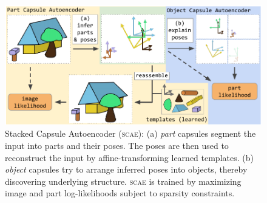 \begin{figure}
        \centering
        \includegraphics[width=.68\linewidth]{figures/SCA/blocks_v4}
        \caption{
            Stacked Capsule Autoencoder (\textsc{scae}):
            (a) \textit{part} capsules segment the input into parts and their poses. The poses are then used to reconstruct the input by affine-transforming learned templates.
            (b) \textit{object} capsules try to arrange inferred poses into objects, thereby discovering underlying structure.
            \textsc{scae} is trained by maximizing image and part log-likelihoods subject to sparsity constraints.
        }
        \label{fig:capsule_arch}
\end{figure}


